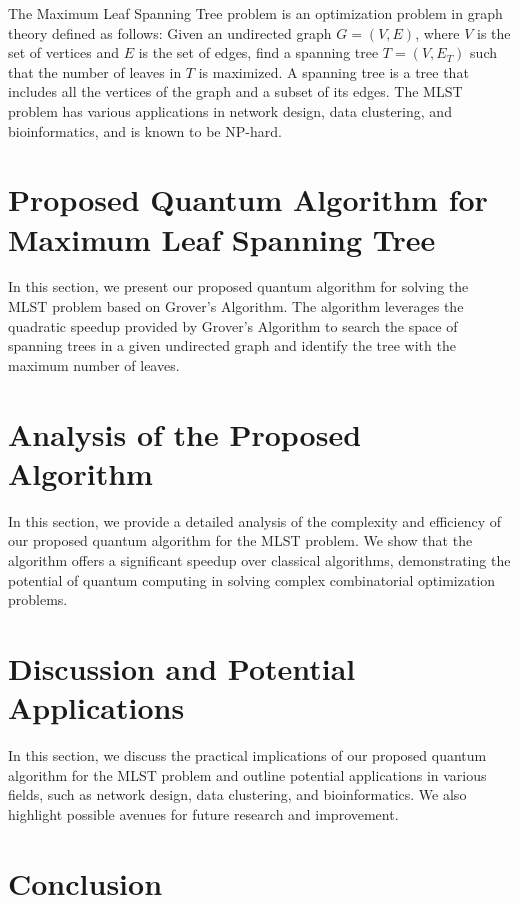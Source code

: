 The Maximum Leaf Spanning Tree problem is an optimization problem in graph theory defined as follows: Given an undirected graph $G=(V, E)$, where $V$ is the set of vertices and $E$ is the set of edges, find a spanning tree $T=(V, E_T)$ such that the number of leaves in $T$ is maximized. A spanning tree is a tree that includes all the vertices of the graph and a subset of its edges. The MLST problem has various applications in network design, data clustering, and bioinformatics, and is known to be NP-hard.

\section{Proposed Quantum Algorithm for Maximum Leaf Spanning Tree}\label{sec:proposed_algorithm}

In this section, we present our proposed quantum algorithm for solving the MLST problem based on Grover's Algorithm. The algorithm leverages the quadratic speedup provided by Grover's Algorithm to search the space of spanning trees in a given undirected graph and identify the tree with the maximum number of leaves.

\section{Analysis of the Proposed Algorithm}\label{sec:analysis}

In this section, we provide a detailed analysis of the complexity and efficiency of our proposed quantum algorithm for the MLST problem. We show that the algorithm offers a significant speedup over classical algorithms, demonstrating the potential of quantum computing in solving complex combinatorial optimization problems.

\section{Discussion and Potential Applications}\label{sec:discussion}

In this section, we discuss the practical implications of our proposed quantum algorithm for the MLST problem and outline potential applications in various fields, such as network design, data clustering, and bioinformatics. We also highlight possible avenues for future research and improvement.

\section{Conclusion}\label{sec:conclusion}

